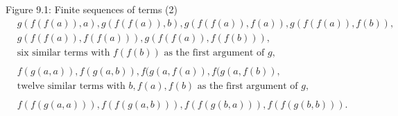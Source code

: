 \documentclass[style=simple,size=12pt]{powerdot}
\begin{document}
\begin{wideslide}[bm=,toc=]{Figure 9.1: Finite sequences of terms (2)}
\vspace*{-4ex}
\begin{displaymath}
\begin{array}{ll}
    & g(f(f(a)),a)\comma g(f(f(a)),b)\comma g(f(f(a)),f(a)) \comma g(f(f(a)),f(b)),\\
    & g(f(f(a)), f(f(a))) \comma g(f(f(a)), f(f(b))),\\
    & \textrm{six similar terms with $f(f(b))$ as the first argument of $g$},\\
&\\
    & f(g(a,a))\comma f(g(a,b)) \comma f(g(a,f(a))\comma f(g(a,f(b)), \\
    & \textrm{twelve similar terms with $b, f(a), f(b)$ as the first
    argument of $g$},\\
&\\
    & f(f(g(a,a)))\comma f(f(g(a,b))) \comma f(f(g(b,a)))\comma f(f(g(b,b))).\\ 
\end{array}
\end{displaymath}
\end{wideslide}
\end{document}
